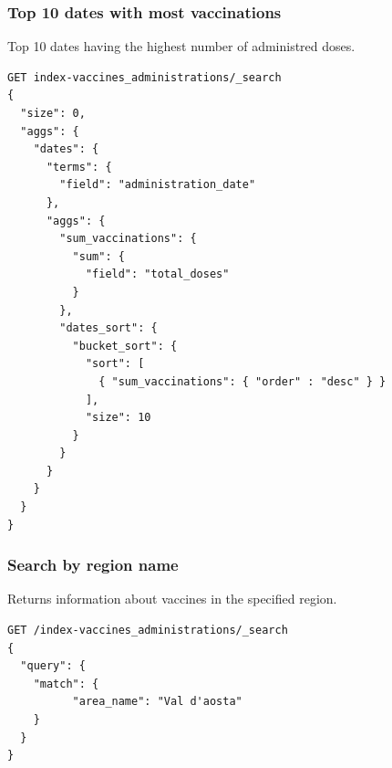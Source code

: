 \documentclass[12pt, a4paper]{article}
\begin{document}
\subsubsection{Top 10 dates with most vaccinations}
Top 10 dates having the highest number of administred doses.
\begin{tcolorbox}[fontupper=\scriptsize]
  \begin{verbatim}
GET index-vaccines_administrations/_search
{
  "size": 0,
  "aggs": {
    "dates": {
      "terms": { 
        "field": "administration_date" 
      },
      "aggs": {
        "sum_vaccinations": {
          "sum": {
            "field": "total_doses"
          }
        },
        "dates_sort": {
          "bucket_sort": {
            "sort": [
              { "sum_vaccinations": { "order" : "desc" } }
            ],
            "size": 10
          }
        }
      }
    }
  }
}
  \end{verbatim}
\end{tcolorbox}

\subsubsection{Search by region name}
Returns information about vaccines in the specified region.
\begin{tcolorbox}[fontupper=\scriptsize]
  \begin{verbatim}
GET /index-vaccines_administrations/_search
{
  "query": {
    "match": {
          "area_name": "Val d'aosta"
    }
  }
}
  \end{verbatim}
\end{tcolorbox}
\end{document}
